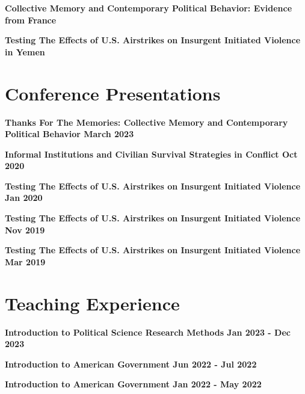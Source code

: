 \documentclass[margin]{res}
\newcommand{\fullhrulefill}{%
  \hspace*{-\sectionwidth}\hrulefill%
  }
\begin{document}
\begin{resume}
\textbf{Collective Memory and Contemporary Political Behavior: Evidence from France}

\textbf {Testing The Effects of U.S. Airstrikes on Insurgent Initiated Violence in Yemen}



\fullhrulefill
\section {Conference Presentations}

\textbf {Thanks For The Memories: Collective Memory and Contemporary Political Behavior \hfill{March 2023}  \\ }

\textbf {Informal Institutions and Civilian Survival Strategies in Conflict \hfill{Oct 2020}  \\ }

\textbf {Testing The Effects of U.S. Airstrikes on Insurgent Initiated Violence \hfill{Jan 2020}  \\ }

\textbf {Testing The Effects of U.S. Airstrikes on Insurgent Initiated Violence \hfill{Nov 2019}  \\ }

\textbf {Testing The Effects of U.S. Airstrikes on Insurgent Initiated Violence \hfill{Mar 2019} \\ }

\fullhrulefill

\section {Teaching Experience}

\textbf {Introduction to Political Science Research Methods \hfill {Jan 2023 - Dec 2023} \\ }

\textbf {Introduction to American Government \hfill {Jun 2022 - Jul 2022} \\ }

\textbf {Introduction to American Government \hfill {Jan 2022 - May 2022} \\ }



\end{resume}
\end{document}
